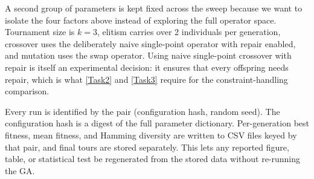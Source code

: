 A second group of parameters is kept fixed across the sweep because we want
to isolate the four factors above instead of exploring the full operator space.
Tournament size is $k=3$, elitism carries over 2 individuals per generation,
crossover uses the deliberately naive single-point operator with repair
enabled, and mutation uses the swap operator. Using naive single-point
crossover with repair is itself an experimental decision: it ensures that
every offspring needs repair, which is what \cref{Task2} and
\cref{Task3} require for the constraint-handling comparison.

Every run is identified by the pair (configuration hash, random seed). The
configuration hash is a digest of the full parameter dictionary. Per-generation
best fitness, mean fitness, and Hamming diversity are written to CSV files
keyed by that pair, and final tours are stored separately. This lets any
reported figure, table, or statistical test be regenerated from the stored
data without re-running the GA.
